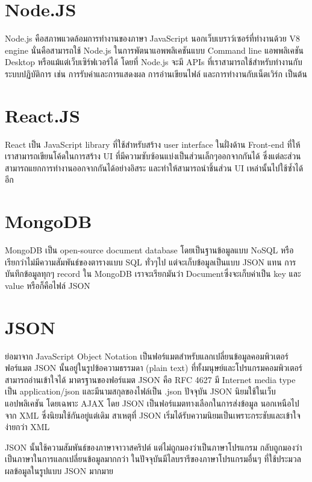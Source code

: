 \section{Node.JS}
Node.js คือสภาพแวดล้อมการทำงานของภาษา JavaScript นอกเว็บเบราว์เซอร์ที่ทำงานด้วย V8 engine นั่นคือสามารถใช้ Node.js ในการพัตนาแอพพลิเคชันแบบ Command line แอพพลิเคชัน Desktop หรือแม้แต่เว็บเซิร์ฟเวอร์ได้ 
โดยที่ Node.js จะมี APIs ที่เราสามารถใช้สำหรับทำงานกับระบบปฏิบัติการ เช่น การรับค่าและการแสดงผล การอ่านเขียนไฟล์ และการทำงานกับเน็ตเวิร์ก เป็นต้น

\section{React.JS}
React เป็น JavaScript library ที่ใช้สำหรับสร้าง user interface ในฝั่งด้าน Front-end ที่ให้เราสามารถเขียนโค้ดในการสร้าง UI ที่มีความซับซ้อนแบ่งเป็นส่วนเล็กๆออกจากกันได้ ซึ่งแต่ละส่วนสามารถแยกการทำงานออกจากกันได้อย่างอิสระ 
และทำให้สามารถนำชิ้นส่วน UI เหล่านั้นไปใช้ซ้ำได้อีก

\section{MongoDB}
MongoDB เป็น open-source document database โดยเป็นฐานข้อมูลแบบ NoSQL หรือเรียกว่าไม่มีความสัมพันธ์ของตารางแบบ SQL ทั่วๆไป แต่จะเก็บข้อมูลเป็นแบบ JSON แทน การบันทึกข้อมูลทุกๆ record ใน MongoDB 
เราจะเรียกมันว่า Documentซึ่งจะเก็บค่าเป็น key และ value หรือก็คือไฟล์ JSON

\section{JSON}
ย่อมาจาก JavaScript Object Notation เป็นฟอร์แมตสำหรับแลกเปลี่ยนข้อมูลคอมพิวเตอร์ ฟอร์แมต JSON นั้นอยู่ในรูปข้อความธรรมดา (plain text) ที่ทั้งมนุษย์และโปรแกรมคอมพิวเตอร์สามารถอ่านเข้าใจได้ 
มาตรฐานของฟอร์แมต JSON คือ RFC 4627 มี Internet media type เป็น application/json และมีนามสกุลของไฟล์เป็น .json
ปัจจุบัน JSON นิยมใช้ในเว็บแอปพลิเคชัน โดยเฉพาะ AJAX โดย JSON เป็นฟอร์แมตทางเลือกในการส่งข้อมูล นอกเหนือไปจาก XML ซึ่งนิยมใช้กันอยู่แต่เดิม สาเหตุที่ JSON เริ่มได้รับความนิยมเป็นเพราะกระชับและเข้าใจง่ายกว่า XML

JSON นั้นใช้ความสัมพันธ์ของภาษาจาวาสคริปต์ แต่ไม่ถูกมองว่าเป็นภาษาโปรแกรม กลับถูกมองว่าเป็นภาษาในการแลกเปลี่ยนข้อมูลมากกว่า ในปัจจุบันมีไลบรารีของภาษาโปรแกรมอื่นๆ ที่ใช้ประมวลผลข้อมูลในรูปแบบ JSON มากมาย







